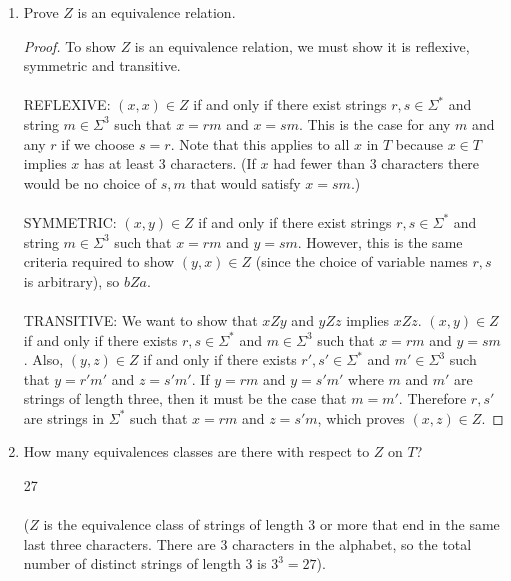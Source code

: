 \documentclass[]{exam}
\begin{document}
\begin{questions}
\begin{enumerate}[label=\alph*)]
\item Prove $Z$ is an equivalence relation.
\begin{solution}
\begin{proof}
To show $Z$ is an equivalence relation, we must show it is reflexive, symmetric
and transitive.
\\~\\
REFLEXIVE: $(x,x) \in Z$ if and only if there exist strings $r,s \in \Sigma^*$ and
string $m \in \Sigma^3$ such that $x = rm$ and $x = sm$. This is the case
for any $m$ and any $r$ if we choose $s = r$. Note that this applies to
all $x$ in $T$ because $x \in T$ implies $x$ has at least $3$ characters. (If
$x$ had fewer than $3$ characters there would be no choice of $s,m$ that would
satisfy $x = sm$.)
\\~\\
SYMMETRIC: $(x,y) \in Z$ if and only if there exist strings $r,s \in \Sigma^*$ and
string $m \in \Sigma^3$ such that $x = rm$ and $y = sm$. However, this is
the same criteria required to show $(y,x) \in Z$ (since the choice of variable
names $r,s$ is arbitrary), so $bZa$.
\\~\\
TRANSITIVE: We want to show that $xZy$ and $yZz$ implies $xZz$. $(x,y) \in Z$
if and only if there exists $r,s \in \Sigma^*$ and $m \in \Sigma^3$ such 
that $x = rm$ and $y = sm$.  Also, $(y,z) \in Z$ if and only if there 
exists $r',s' \in \Sigma^*$ 
and $m' \in \Sigma^3$ such that $y = r'm'$ and $z = s'm'$. If $y = rm$
and $y = s'm'$ where $m$ and $m'$ are strings of length three, then
it must be the case that $m = m'$. Therefore $r, s'$ are strings in
$\Sigma^*$ such that $x = rm$ and $z = s'm$, which proves $(x,z) \in Z$.
\end{proof}
\end{solution}

\item How many equivalences classes are there with respect to $Z$ on $T$?
\begin{solution}
27
\\~\\
($Z$ is the equivalence class of strings of length $3$ or more that end in
the same last three characters. There are $3$ characters in the alphabet,
so the total number of distinct strings of length $3$ is $3^3 = 27$).
\end{solution}
\end{enumerate}


\end{questions}
\end{document}
